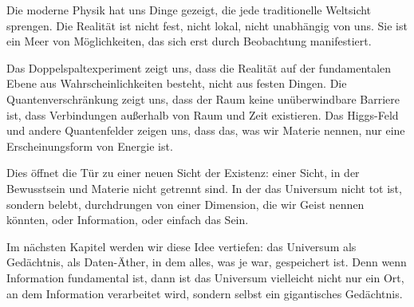 Die moderne Physik hat uns Dinge gezeigt, die jede traditionelle Weltsicht sprengen. Die Realität ist nicht fest, nicht lokal, nicht unabhängig von uns. Sie ist ein Meer von Möglichkeiten, das sich erst durch Beobachtung manifestiert.

Das Doppelspaltexperiment zeigt uns, dass die Realität auf der fundamentalen Ebene aus Wahrscheinlichkeiten besteht, nicht aus festen Dingen. Die Quantenverschränkung zeigt uns, dass der Raum keine unüberwindbare Barriere ist, dass Verbindungen außerhalb von Raum und Zeit existieren. Das Higgs-Feld und andere Quantenfelder zeigen uns, dass das, was wir \glqq Materie\grqq{} nennen, nur eine Erscheinungsform von Energie ist.

Dies öffnet die Tür zu einer neuen Sicht der Existenz: einer Sicht, in der Bewusstsein und Materie nicht getrennt sind. In der das Universum nicht tot ist, sondern belebt, durchdrungen von einer Dimension, die wir \glqq Geist\grqq{} nennen könnten, oder \glqq Information\grqq{}, oder einfach \glqq das Sein\grqq{}.

Im nächsten Kapitel werden wir diese Idee vertiefen: das Universum als Gedächtnis, als Daten-Äther, in dem alles, was je war, gespeichert ist. Denn wenn Information fundamental ist, dann ist das Universum vielleicht nicht nur ein Ort, an dem Information verarbeitet wird, sondern selbst ein gigantisches Gedächtnis.
